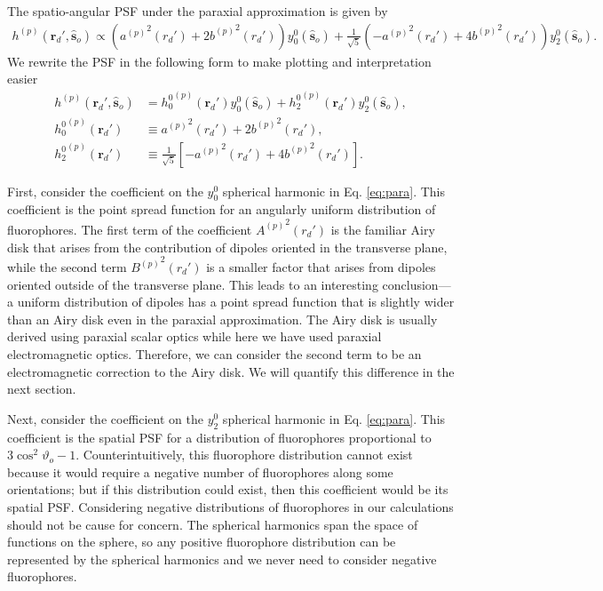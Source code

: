 \documentclass[11pt]{article}
\providecommand{\so}[1]{\mathbf{\hat{s}}_o}
\providecommand{\rd}[1]{\mathbf{r}_d}
\begin{document}
The spatio-angular PSF under the paraxial approximation is given by
\begin{align}
      h^{(p)}(\rd{}', \so{}) \propto \left({a^{(p)}}^2(r_d') + 2{b^{(p)}}^2(r_d')\right)y_0^0(\so{}) + \frac{1}{\sqrt{5}}\left(-{a^{(p)}}^2(r_d') + {4b^{(p)}}^2(r_d')\right)y_2^{0}(\so{})\label{eq:para}.
\end{align}
We rewrite the PSF in the following form to make plotting and interpretation easier
\begin{align}
  h^{(p)}(\rd{}', \so{}) &= {h_0^0}^{(p)}(\rd{}')y_0^0(\so{}) + {h_2^0}^{(p)}(\rd{}')y_2^0(\so{}),\\
  {h_0^0}^{(p)}(\rd{}') &\equiv {a^{(p)}}^2(r_d') + 2{b^{(p)}}^2(r_d'),\\
  {h_2^0}^{(p)}(\rd{}') &\equiv \frac{1}{\sqrt{5}}\left[- {a^{(p)}}^2(r_d') + 4{b^{(p)}}^2(r_d')\right]. \label{eq:concisepsf}
\end{align}

First, consider the coefficient on the $y_0^0$ spherical harmonic in Eq.
\ref{eq:para}. This coefficient is the point spread function for an angularly
uniform distribution of fluorophores. The first term of the coefficient
${A^{(p)}}^2(r_d')$ is the familiar Airy disk that arises from the contribution
of dipoles oriented in the transverse plane, while the second term
${B^{(p)}}^2(r_d')$ is a smaller factor that arises from dipoles oriented
outside of the transverse plane. This leads to an interesting conclusion---a
uniform distribution of dipoles has a point spread function that is slightly
wider than an Airy disk even in the paraxial approximation. The Airy disk is
usually derived using paraxial scalar optics while here we have used paraxial
electromagnetic optics. Therefore, we can consider the second term to be an
electromagnetic correction to the Airy disk. We will quantify this difference in
the next section.

Next, consider the coefficient on the $y_2^0$ spherical harmonic in
Eq. \ref{eq:para}. This coefficient is the spatial PSF for a distribution of
fluorophores proportional to $3\cos^2\vartheta_o - 1$. Counterintuitively, this
fluorophore distribution cannot exist because it would require a negative number
of fluorophores along some orientations; but if this distribution could exist,
then this coefficient would be its spatial PSF. Considering negative
distributions of fluorophores in our calculations should not be cause for
concern. The spherical harmonics span the space of functions on the sphere, so
any positive fluorophore distribution can be represented by the spherical
harmonics and we never need to consider negative fluorophores.
    
\end{document}
